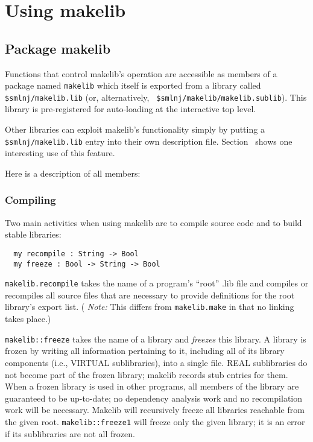 
\section{Using makelib}

\subsection{Package makelib}
\label{sec:api}

Functions that control makelib's operation are accessible as members of a
package named {\tt makelib} which itself is exported from a library
called {\tt \$smlnj/makelib.lib} (or, alternatively, {\tt
\$smlnj/makelib/makelib.sublib}).  This library is pre-registered for auto-loading
at the interactive top level.

Other libraries can exploit makelib's functionality simply by putting a
{\tt \$smlnj/makelib.lib} entry into their own description file.
Section~ shows one interesting use of this feature.

Here is a description of all members:

\subsubsection{Compiling}
\label{sec:api:compiling}

Two main activities when using makelib are to compile source code and to
build stable libraries:

\begin{verbatim}
  my recompile : String -> Bool
  my freeze : Bool -> String -> Bool
\end{verbatim}

{\tt makelib.recompile} takes the name of a program's ``root'' .lib
file and compiles or recompiles all source files that are necessary
to provide definitions for the root library's export list.  ({\em
Note:} This differs from {\tt makelib.make} in that no linking takes
place.)

{\tt makelib::freeze} takes the name of a library
and {\em freezes} this library.  A library is frozen by writing
all information pertaining to it, including all of its library
components (i.e., VIRTUAL sublibraries), into a single file.  REAL sublibraries do not
become part of the frozen library; makelib records stub entries for them.
When a frozen library is used in other programs, all members of
the library are guaranteed to be up-to-date; no dependency analysis
work and no recompilation work will be necessary.
Makelib will recursively freeze all libraries reachable from the given root.
{\tt makelib::freeze1} will freeze only the given library;  it is an
error if its sublibraries are not all frozen.


